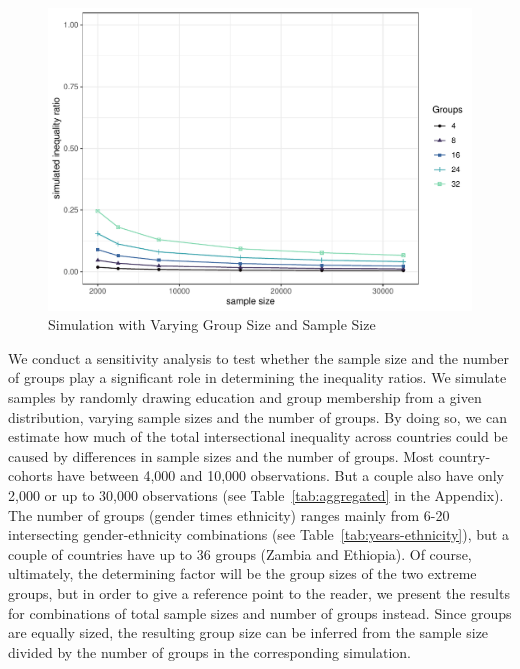 \begin{figure}[htb]
\includegraphics[width=0.9\linewidth,]{figures/sensitivity-groups.pdf} \caption[Simulation with Varying Group Size and Sample Size]{Simulation with Varying Group Size and Sample Size}\label{fig:sensitivity}
 \end{figure}

We conduct a sensitivity analysis to test whether the sample size and the number of groups play a significant role in determining the inequality ratios. We simulate samples by randomly drawing education and group membership from a given distribution, varying sample sizes and the number of groups. By doing so, we can estimate how much of the total intersectional inequality across countries could be caused by differences in sample sizes and the number of groups. Most country-cohorts have between 4,000 and 10,000 observations. But a couple also have only 2,000 or up to 30,000 observations (see Table~\ref{tab:aggregated} in the Appendix). The number of groups (gender times ethnicity) ranges mainly from 6-20 intersecting gender-ethnicity combinations (see Table~\ref{tab:years-ethnicity}), but a couple of countries have up to 36 groups (Zambia and Ethiopia). Of course, ultimately, the determining factor will be the group sizes of the two extreme groups, but in order to give a reference point to the reader, we present the results for combinations of total sample sizes and number of groups instead. Since groups are equally sized, the resulting group size can be inferred from the sample size divided by the number of groups in the corresponding simulation.


